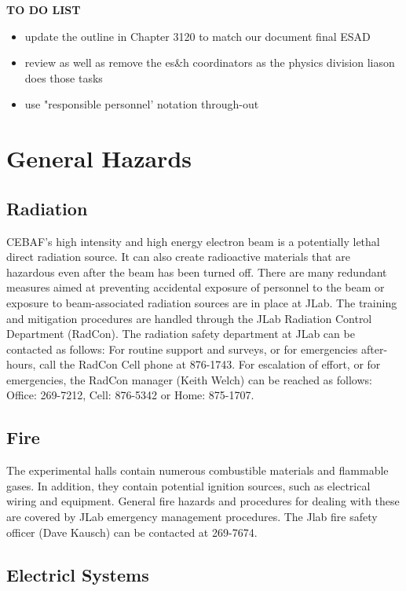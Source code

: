 {\it{{\bf{TO DO LIST}}
\begin{itemize}
\item update the outline in Chapter 3120 to match our document final ESAD
\item review as well as remove
the es\&h coordinators as the physics division liason does those tasks
\item use "responsible personnel' notation through-out
\end{itemize}


\chapter{General Hazards}

\section{Radiation}
	
CEBAF's high intensity and high energy electron beam is a potentially lethal direct radiation source. 
It can also create radioactive materials that are hazardous even  after the beam has been turned off. 
There are many redundant measures aimed at preventing accidental exposure of personnel to the beam 
or exposure to beam-associated radiation sources are in place at JLab. The training and mitigation 
procedures are handled through the JLab Radiation Control Department (RadCon). The radiation safety 
department at JLab can be contacted as follows: For routine support and surveys, or for emergencies 
after-hours, call the RadCon Cell phone at 876-1743. For escalation of effort, or for emergencies, 
the RadCon manager (Keith Welch) can be reached as follows: Office: 269-7212, Cell: 876-5342 or Home:  875-1707.

\section{Fire}

	The experimental halls contain numerous combustible materials and flammable gases. 
In addition, they contain potential ignition sources, such as electrical wiring and equipment. 
General fire hazards and procedures for dealing with these are covered by JLab emergency 
management procedures. The Jlab fire safety officer (Dave Kausch) can be contacted at 269-7674.

\section{Electricl Systems}

}}
